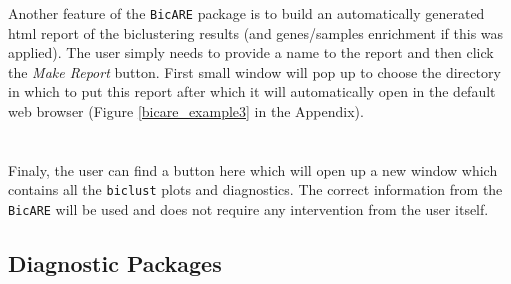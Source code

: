 \documentclass[a4paper]{article}\usepackage[]{graphicx}\usepackage[]{color}
\begin{document}
Another feature of the \verb|BicARE| package is to build an automatically
generated html report of the biclustering results (and genes/samples enrichment
if this was applied). The user simply needs to provide a name to the report and
then click the {\it Make Report} button. First small window will pop up to
choose the directory in which to put this report after which it will
automatically open in the default web browser (Figure \ref{bicare_example3} in the Appendix).
\\ \\
\\
Finaly, the user can find a button here which will open up a new window which
contains all the \verb|biclust| plots and diagnostics. The correct information
from the \verb|BicARE| will be used and does not require any intervention from
the user itself.


\subsection{Diagnostic Packages}
\end{document}
